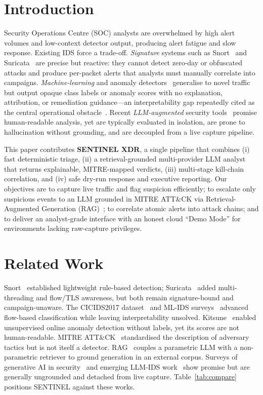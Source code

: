 \documentclass[conference]{IEEEtran}
\begin{document}
\section{Introduction}
Security Operations Centre (SOC) analysts are overwhelmed by high alert volumes and low-context detector output, producing alert fatigue and slow response. Existing IDS force a trade-off. \emph{Signature} systems such as Snort~\cite{snort} and Suricata~\cite{suricata} are precise but reactive: they cannot detect zero-day or obfuscated attacks and produce per-packet alerts that analysts must manually correlate into campaigns. \emph{Machine-learning} and anomaly detectors~\cite{cicids,buczak,kitsune} generalise to novel traffic but output opaque class labels or anomaly scores with no explanation, attribution, or remediation guidance---an interpretability gap repeatedly cited as the central operational obstacle~\cite{buczak}. Recent \emph{LLM-augmented} security tools~\cite{threatgpt,genai} promise human-readable analysis, yet are typically evaluated in isolation, are prone to hallucination without grounding, and are decoupled from a live capture pipeline.

This paper contributes \textbf{SENTINEL XDR}, a single pipeline that combines (i) fast deterministic triage, (ii) a retrieval-grounded multi-provider LLM analyst that returns explainable, MITRE-mapped verdicts, (iii) multi-stage kill-chain correlation, and (iv) safe dry-run response and executive reporting. Our objectives are to capture live traffic and flag suspicion efficiently; to escalate only suspicious events to an LLM grounded in MITRE ATT\&CK via Retrieval-Augmented Generation (RAG)~\cite{rag}; to correlate atomic alerts into attack chains; and to deliver an analyst-grade interface with an honest cloud ``Demo Mode'' for environments lacking raw-capture privileges.

\section{Related Work}
Snort~\cite{snort} established lightweight rule-based detection; Suricata~\cite{suricata} added multi-threading and flow/TLS awareness, but both remain signature-bound and campaign-unaware. The CICIDS2017 dataset~\cite{cicids} and ML-IDS surveys~\cite{buczak} advanced flow-based classification while leaving interpretability unsolved. Kitsune~\cite{kitsune} enabled unsupervised online anomaly detection without labels, yet its scores are not human-readable. MITRE ATT\&CK~\cite{attack} standardised the description of adversary tactics but is not itself a detector. RAG~\cite{rag} couples a parametric LLM with a non-parametric retriever to ground generation in an external corpus. Surveys of generative AI in security~\cite{threatgpt} and emerging LLM-IDS work~\cite{genai} show promise but are generally ungrounded and detached from live capture. Table~\ref{tab:compare} positions SENTINEL against these works.
\end{document}
